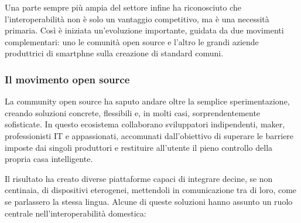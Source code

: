 Una parte sempre più ampia del settore infine ha riconosciuto che l’interoperabilità non è solo un vantaggio competitivo, ma è una necessità primaria. Così è iniziata un’evoluzione importante, guidata da due movimenti complementari: uno le comunità open source e l’altro le grandi aziende produttrici di smartphne sulla creazione di standard comuni.

\subsubsection{Il movimento open source}

La community open source ha saputo andare  oltre la semplice sperimentazione, creando soluzioni concrete, flessibili e, in molti casi, sorprendentemente sofisticate. In questo ecosistema collaborano sviluppatori indipendenti, maker, professionisti IT e appassionati, accomunati dall’obiettivo di superare le barriere imposte dai singoli produttori e restituire all’utente il pieno controllo della propria casa intelligente.

Il risultato ha creato diverse piattaforme capaci di integrare decine, se non centinaia, di dispositivi eterogenei, mettendoli in comunicazione tra di loro, come se parlassero la stessa lingua. Alcune di queste soluzioni hanno assunto un ruolo centrale nell’interoperabilità domestica:

